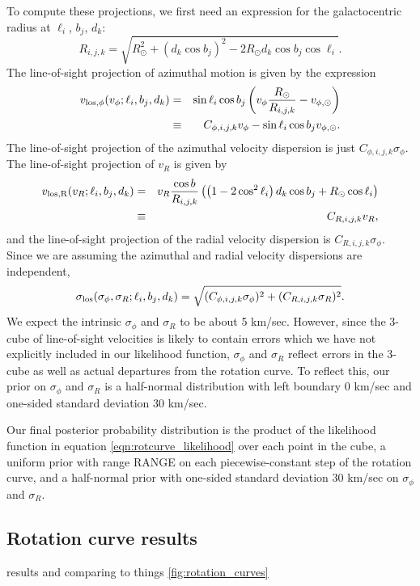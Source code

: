 To compute these projections, we first need an expression for the galactocentric radius at $\ell_i$, $b_j$, $d_k$:
\begin{equation}
\label{eqn:radius}
    R_{i,j,k} = \sqrt{ R_\odot^2 + (d_k \cos b_j)^2 - 2 R_\odot d_k \cos b_j \cos \ell_i}.
\end{equation}
The line-of-sight projection of azimuthal motion is given by the expression
\begin{eqnarray}
\label{eqn:velo-los-phi}
    v_{\rm{los}, \phi}(v_\phi; \ell_i, b_j, d_k) &=& \sin \ell_i \cos b_j  \left( v_\phi \frac{R_\odot}{R_{i,j,k}} - v_{\phi, \odot} \right)\\
    &\equiv& C_{\phi,i,j,k} v_\phi - \sin \ell_i \cos b_j v_{\phi, \odot}.
\end{eqnarray}
The line-of-sight projection of the azimuthal velocity dispersion is just $C_{\phi,i,j,k} \sigma_\phi$. The line-of-sight projection of $v_R$ is given  by 
\begin{eqnarray}
\label{eqn:velo-los-radial}
    v_{\rm{los}, R} (v_R; \ell_i,  b_j, d_k) &=& v_R \frac{\cos b}{R_{i,j,k}} \left( \left( 1 - 2 \cos^2 \ell_i \right) d_k \cos b_j + R_\odot \cos \ell_i \right)\\
    &\equiv& C_{R,i,j,k} v_R,
\end{eqnarray}
and the line-of-sight projection of the radial velocity dispersion is $C_{R,i,j,k} \sigma_\phi$. Since we are assuming the azimuthal and radial velocity dispersions are independent,
\begin{equation}
\label{eqn:velo-los-dispersion}
    \sigma_{\rm{los}} (\sigma_\phi, \sigma_R; \ell_i, b_j, d_k) = \sqrt{ (C_{\phi,i,j,k} \sigma_\phi)^2 + (C_{R,i,j,k} \sigma_R)^2 }.
\end{equation}
We expect the intrinsic $\sigma_\phi$ and $\sigma_R$ to be about 5 km/sec. However, since the 3-cube of line-of-sight velocities is likely to contain errors which we have not explicitly included in our likelihood function, $\sigma_\phi$ and $\sigma_R$ reflect errors in the 3-cube as well as actual departures from the rotation curve. To reflect this, our prior on $\sigma_\phi$ and $\sigma_R$ is a half-normal distribution with left boundary 0 km/sec and one-sided standard deviation 30 km/sec. 

Our final posterior probability distribution is the product of the likelihood function in equation \ref{eqn:rotcurve_likelihood} over each point in the cube, a uniform prior with range RANGE on each piecewise-constant step of the rotation curve, and a half-normal prior with one-sided standard deviation 30 km/sec on $\sigma_\phi$ and $\sigma_R$. 

\subsection{Rotation curve results}
results and comparing to things \ref{fig:rotation_curves}